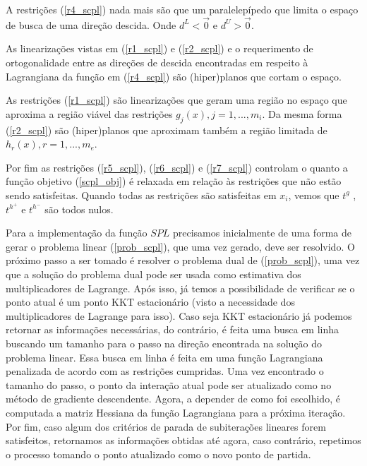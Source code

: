 A restrições (\ref{r4_scpl}) nada mais são que um paralelepípedo que limita o espaço de busca de uma
direção descida. Onde \( d^L < \overrightarrow 0 \) e \( d^U > \overrightarrow 0 \).

As linearizações vistas em (\ref{r1_scpl}) e (\ref{r2_scpl}) e o requerimento de ortogonalidade entre
as direções de descida encontradas em respeito à Lagrangiana da função em (\ref{r4_scpl}) são (hiper)planos
que cortam o espaço.

As restrições (\ref{r1_scpl}) são linearizações que geram uma região no espaço que aproxima a região viável
das restrições \( g_j(x), j=1, ..., m_i \). Da mesma forma (\ref{r2_scpl}) são (hiper)planos que aproximam
também a região limitada de \( h_r(x), r=1, ..., m_e \).

Por fim as restrições (\ref{r5_scpl}), (\ref{r6_scpl}) e (\ref{r7_scpl}) controlam o quanto a função objetivo
(\ref{scpl_obj}) é relaxada em relação às restrições que não estão sendo satisfeitas. Quando todas as restrições
são satisfeitas em \(x_i\), vemos que \( t^g \) ,\(t^{h^+}\) e \(t^{h^-} \) são todos nulos.


Para a implementação da função \(SPL\) precisamos inicialmente de uma forma de gerar o problema linear
(\ref{prob_scpl}), que uma vez gerado, deve ser resolvido. O próximo passo a ser tomado é resolver
o problema dual de (\ref{prob_scpl}), uma vez que a solução do problema dual pode ser usada como estimativa
dos multiplicadores de Lagrange. Após isso, já temos a possibilidade de verificar se o ponto atual é um
ponto KKT estacionário (visto a necessidade dos multiplicadores de Lagrange para isso). Caso seja KKT
estacionário já podemos retornar as informações necessárias, do contrário, é feita uma busca em linha
buscando um tamanho para o passo na direção encontrada na solução do problema linear. Essa busca em
linha é feita em uma função Lagrangiana penalizada de acordo com as restrições cumpridas. Uma vez
encontrado o tamanho do passo, o ponto da interação atual pode ser atualizado como no método de gradiente
descendente. Agora, a depender de como foi escolhido, é computada a matriz Hessiana da função Lagrangiana
para a próxima iteração. Por fim, caso algum dos critérios de parada de subiterações lineares forem
satisfeitos, retornamos as informações obtidas até agora, caso contrário, repetimos o processo tomando
o ponto atualizado como o novo ponto de partida.


